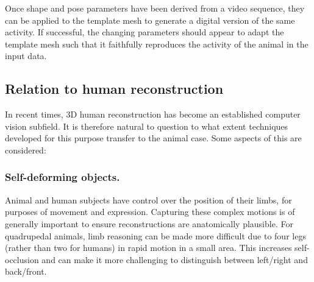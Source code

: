 Once shape and pose parameters have been derived from a video sequence, they can be applied to the template mesh to generate a digital version of the same activity. If successful, the changing parameters should appear to adapt the template mesh such that it faithfully reproduces the activity of the animal in the input data. 


\subsection{Relation to human reconstruction}
In recent times, 3D human reconstruction has become an established computer vision subfield. It is therefore natural to question to what extent techniques developed for this purpose transfer to the animal case. Some aspects of this are considered:



\subsubsection*{Self-deforming objects.} Animal and human subjects have control over the position of their limbs, for purposes of movement and expression. Capturing these complex motions is of generally important to ensure reconstructions are anatomically plausible. For quadrupedal animals, limb reasoning can be made more difficult due to four legs (rather than two for humans) in rapid motion in a small area. This increases self-occlusion and can make it more challenging to distinguish between left/right and back/front.

